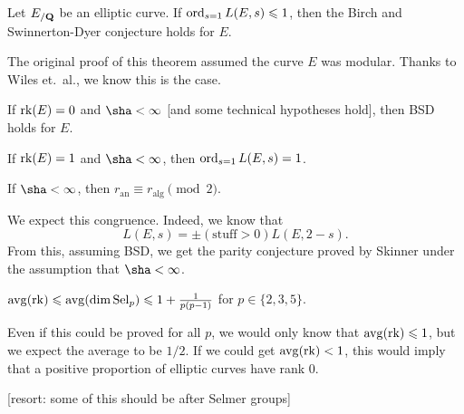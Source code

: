 \begin{theorem}
Let $E_{/\mathbf{Q}}$ be an elliptic curve. If $\operatorname{ord}_{s=1}L(E,s)\leqslant 1$, 
then the Birch and Swinnerton-Dyer conjecture holds for $E$. 
\end{theorem}

The original proof of this theorem assumed the curve $E$ was modular. Thanks 
to Wiles et.~al., we know this is the case. 

\begin{theorem}
If $\operatorname{rk}(E)=0$ and $\sha<\infty$ [and some technical hypotheses hold], then 
BSD holds for $E$. 
\end{theorem}

\begin{theorem}[Skinner]
If $\operatorname{rk}(E)=1$ and $\sha<\infty$, then $\operatorname{ord}_{s=1} L(E,s)=1$. 
\end{theorem}

\begin{theorem}
If $\sha<\infty$, then $r_\mathrm{an}\equiv r_\mathrm{alg}\pmod 2$. 
\end{theorem}

We expect this congruence. Indeed, we know that 
\[
  L(E,s) = \pm(\text{stuff}>0)L(E,2-s).
\]
From this, assuming BSD, we get the parity conjecture proved by Skinner 
under the assumption that $\sha<\infty$. 

\begin{theorem}
$\operatorname{avg}(\operatorname{rk}) \leqslant \operatorname{avg}(\dim \operatorname{Sel}_p)\leqslant 1+\frac{1}{p(p-1)}$ 
for $p\in \{2,3,5\}$. 
\end{theorem}

Even if this could be proved for all $p$, we would only know that 
$\operatorname{avg}(\operatorname{rk}) \leqslant 1$, but we expect the average to be $1/2$. If we 
could get $\operatorname{avg}(\operatorname{rk})<1$, this would imply that a positive proportion of 
elliptic curves have rank $0$. 

[resort: some of this should be after Selmer groups]


